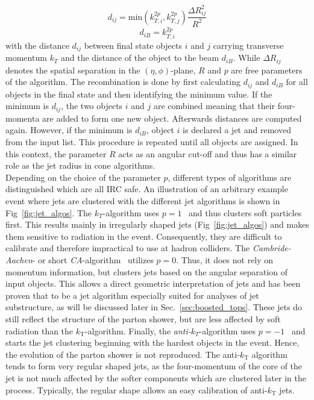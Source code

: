\begin{description}
\begin{equation*}
d_{ij} = \mathrm{min}(k_{T,i}^{2p}, k_{T,j}^{2p}) \frac{\Delta R_{ij}^2}{R^2}
\end{equation*}
\begin{equation*}
d_{iB} = k_{T,i}^{2p}
\end{equation*}
with the distance $d_{ij}$ between final state objects $i$ and $j$ carrying transverse momentum $k_T$ and the distance of the object to the beam $d_{iB}$. While $\Delta R_{ij}$ denotes the spatial separation in the $(\eta, \phi)$-plane, $R$ and $p$ are free parameters of the algorithm. The recombination is done by first calculating $d_{ij}$ and $d_{iB}$ for all objects in the final state and then identifying the minimum value. If the minimum is $d_{ij}$, the two objects $i$ and $j$ are combined meaning that their four-momenta are added to form one new object. Afterwards distances are computed again. However, if the minimum is $d_{iB}$, object $i$ is declared a jet and removed from the input list. This procedure is repeated until all objects are assigned. In this context, the parameter $R$ acts as an angular cut-off and thus has a similar role as the jet radius in cone algorithms. \\
Depending on the choice of the parameter $p$, different types of algorithms are distinguished which are all IRC safe. An illustration of an arbitrary example event where jets are clustered with the different jet algorithms is shown in Fig~\ref{fig:jet_algos}. The $k_T$-algorithm uses $p = 1$~\cite{PhysRevD.48.3160} and thus clusters soft particles first. This results mainly in irregularly shaped jets (\cf Fig~\ref{fig:jet_algos}) and makes them sensitive to radiation in the event. Consequently, they are difficult to calibrate and therefore impractical to use at hadron colliders. The \textit{Cambride-Aachen}- or short \textit{CA}-algorithm~\cite{Dokshitzer:1997in, Wobisch:1998wt} utilizes $p = 0$. Thus, it does not rely on momentum information, but clusters jets based on the angular separation of input objects. This allows a direct geometric interpretation of jets and has been proven that to be a jet algorithm especially suited for analyses of jet substructure, as will be discussed later in Sec.~\ref{sec:boosted_tops}. These jets do still reflect the structure of the parton shower, but are less affected by soft radiation than the $k_\mathrm{T}$-algorithm. Finally, the \textit{anti-$k_T$}-algorithm uses $p = -1$~\cite{1126-6708-2008-04-063} and starts the jet clustering beginning with the hardest objects in the event. Hence, the evolution of the parton shower is not reproduced. The anti-$k_\mathrm{T}$ algorithm tends to form very regular shaped jets, as the four-momentum of the core of the jet is not much affected by the softer components which are clustered later in the process. Typically, the regular shape allows an easy calibration of anti-$k_\mathrm{T}$ jets. 
\end{description}

